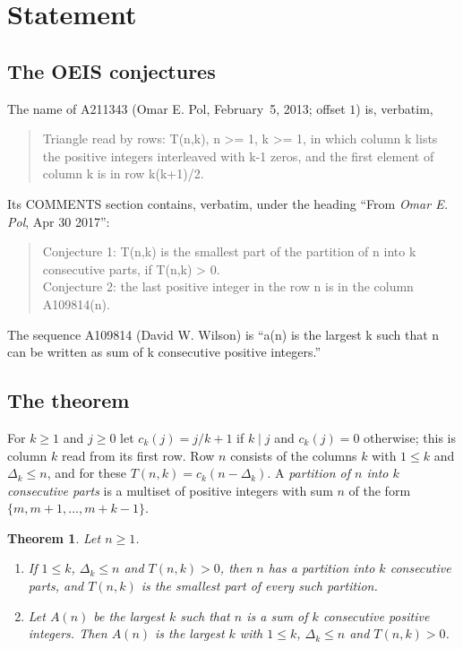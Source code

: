 \documentclass[11pt]{amsart}
\theoremstyle{plain}
\newtheorem{theorem}{Theorem}
\theoremstyle{definition}
\begin{document}
\section{Statement}\label{sec:statement}

\subsection*{The OEIS conjectures}
The name of A211343 \cite{A211343} (Omar E. Pol, February~5, 2013; offset $1$) is, verbatim,
\begin{quote}\small
Triangle read by rows: T(n,k), n \textgreater{}= 1, k \textgreater{}= 1, in which column k lists the positive integers interleaved with k-1 zeros, and the first element of column k is in row k(k+1)/2.
\end{quote}
Its COMMENTS section contains, verbatim, under the heading ``From \emph{Omar E. Pol}, Apr 30 2017'':
\begin{quote}\small
Conjecture 1: T(n,k) is the smallest part of the partition of n into k consecutive parts, if T(n,k) \textgreater{} 0.\\
Conjecture 2: the last positive integer in the row n is in the column A109814(n).
\end{quote}
The sequence A109814 \cite{A109814} (David W. Wilson) is ``a(n) is the largest k such that n can be written as sum of k consecutive positive integers.''

\subsection*{The theorem}
For $k\ge1$ and $j\ge0$ let $c_k(j)=j/k+1$ if $k\mid j$ and $c_k(j)=0$ otherwise; this is column $k$ read from its first row. Row $n$ consists of the columns $k$ with $1\le k$ and $\Delta_k\le n$, and for these $T(n,k)=c_k(n-\Delta_k)$. A \emph{partition of $n$ into $k$ consecutive parts} is a multiset of positive integers with sum $n$ of the form $\{m,m+1,\dots,m+k-1\}$.

\begin{theorem}\label{thm:main}
Let $n\ge1$.
\begin{enumerate}
\item If $1\le k$, $\Delta_k\le n$ and $T(n,k)>0$, then $n$ has a partition into $k$ consecutive parts, and $T(n,k)$ is the smallest part of every such partition.
\item Let $A(n)$ be the largest $k$ such that $n$ is a sum of $k$ consecutive positive integers. Then $A(n)$ is the largest $k$ with $1\le k$, $\Delta_k\le n$ and $T(n,k)>0$.
\end{enumerate}
\end{theorem}
\end{document}
